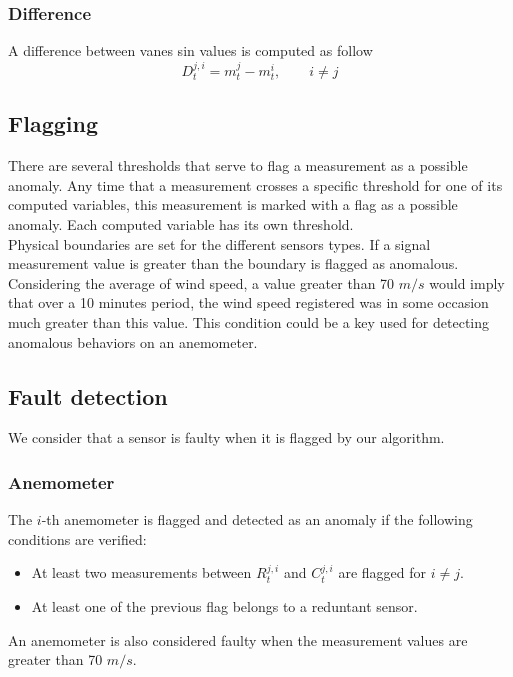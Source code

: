 \documentclass[journal]{IEEEtran}
\begin{document}
\subsubsection{Difference}
A difference between vanes sin values is computed as follow
\begin{equation}
D_{t}^{j,i} = {m_{t}^{j} - m_{t}^{i}},\qquad i \neq j 
\end{equation} 


\subsection{Flagging}\label{subsec:flagging}
There are several thresholds that serve to flag a measurement as a possible anomaly. Any time that a measurement crosses a specific threshold for one of its computed variables, this measurement is marked with a flag as a possible anomaly. 
Each computed variable has its own threshold. \\
Physical boundaries are set for the different sensors types. If a signal measurement value is greater than the boundary is flagged as anomalous. Considering the average of wind speed, a value greater than 70 $m/s$ would imply that over a 10 minutes period, the wind speed registered was in some occasion much greater than this value. This condition could be a key used for detecting anomalous behaviors on an anemometer.

\subsection{Fault detection}\label{subsec:faultdetection}

We consider that a sensor is faulty when it is flagged by our algorithm.
\subsubsection{Anemometer}
The $i$-th anemometer is flagged and detected as an anomaly if the following conditions are verified:
\begin{itemize}
	\item At least two measurements between $R_{t}^{j,i}$ and $C_{t}^{j,i}$ are flagged for $i \neq j$.
	\item At least one of the previous flag belongs to a reduntant sensor.
\end{itemize}
An anemometer is also considered faulty when the measurement values are greater than 70 $m/s$.
\end{document}
